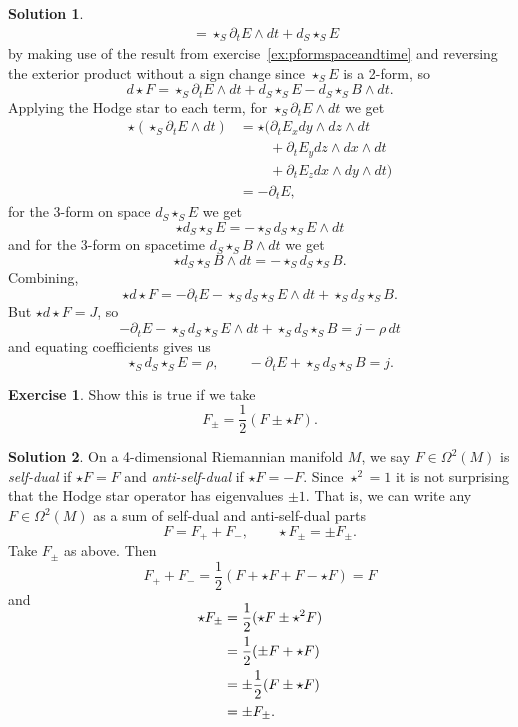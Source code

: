 \documentclass[11pt, a4paper]{report}
\theoremstyle{definition}
\newtheorem{ex}{Exercise}[part]
\newtheorem{sol}{Solution}[part]
\begin{document}
\begin{sol}
\begin{align*}
        &= \star_S \partial_t E \wedge dt + d_S \star_S E
\end{align*}
by making use of the result from exercise~\ref{ex:pformspaceandtime} and reversing the exterior product without a sign change since $\star_S E$ is a 2-form, so
\[
    d \star F = \star_S \partial_t E \wedge dt + d_S \star_S E - d_S \star_S B \wedge dt.
\]
Applying the Hodge star to each term, for $\star_S \partial_t E \wedge dt$ we get
\begin{align*}
    \star (\star_S \partial_t E \wedge dt) &= \star \bigl(
            \partial_t E_x dy \wedge dz \wedge dt \\
            &\phantom{= \star \,\, } + \partial_t E_y dz \wedge dx \wedge dt \\
            &\phantom{= \star \,\, } + \partial_t E_z dx \wedge dy \wedge dt \bigr) \\
        &= - \partial_t E,
\end{align*}
for the 3-form on space $d_S \star_S E$ we get
\[
    \star d_S \star_S E = - \star_S d_S \star_S E \wedge dt
\]
and for the 3-form on spacetime $d_S \star_S B \wedge dt$ we get
\[
    \star d_S \star_S B \wedge dt = - \star_S d_S \star_S B.
\]
Combining,
\[
    \star d \star F = - \partial_t E - \star_S d_S \star_S E \wedge dt + \star_S d_S \star_S B.
\]
But $\star d \star F = J$, so
\[
    - \partial_t E - \star_S d_S \star_S E \wedge dt + \star_S d_S \star_S B = j - \rho \, dt
\]
and equating coefficients gives us
\[
    \star_S d_S \star_S E = \rho, \qquad
    - \partial_t E + \star_S d_S \star_S B = j.
\]

\end{sol}

\begin{ex}

Show this is true if we take
\[
    F_\pm = \frac{1}{2} (F \pm \star F).
\]

\end{ex}

\begin{sol}

On a 4-dimensional Riemannian manifold $M$, we say $F \in \Omega^2(M)$ is \emph{self-dual} if $\star F = F$ and \emph{anti-self-dual} if $\star F = - F$.
Since $\star^2 = 1$ it is not surprising that the Hodge star operator has eigenvalues $\pm 1$. That is, we can write any $F \in \Omega^2(M)$ as a sum of self-dual and anti-self-dual parts
\[
    F = F_+ + F_-, \qquad
    \star F_\pm = \pm F_\pm.
\]
Take $F_\pm$ as above. Then
\[
    F_+ + F_- = \frac{1}{2}(F + \star F + F - \star F) = F
\]
and
\begin{align*}
    \SwapAboveDisplaySkip
    \star F_\pm &= \frac{1}{2} (\star F \pm \star^2 F) \\
                &= \frac{1}{2} (\pm F + \star F) \\
                &= \pm \frac{1}{2} (F \pm \star F) \\
                &= \pm F_\pm.
\end{align*}

\end{sol}
\end{document}
